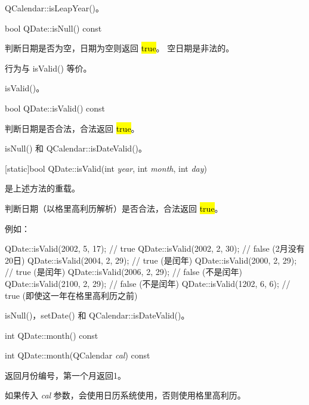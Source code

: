 \begin{seeAlso}
QCalendar::isLeapYear()。
\end{seeAlso}

\splitLine

bool QDate::isNull() const

判断日期是否为空，日期为空则返回 \hl{true}。 空日期是非法的。

\begin{notice}
行为与 isValid() 等价。
\end{notice}

\begin{seeAlso}
isValid()。
\end{seeAlso}

\splitLine

bool QDate::isValid() const

判断日期是否合法，合法返回 \hl{true}。



\begin{seeAlso}
isNull() 和 QCalendar::isDateValid()。
\end{seeAlso}

\splitLine

[static]bool QDate::isValid(int \emph{year}, int \emph{month}, int \emph{day})

是上述方法的重载。

判断日期（以格里高利历解析）是否合法，合法返回 \hl{true}。

例如：

\begin{cppcode}
QDate::isValid(2002, 5, 17);  // true
QDate::isValid(2002, 2, 30);  // false (2月没有20日)
QDate::isValid(2004, 2, 29);  // true (是闰年)
QDate::isValid(2000, 2, 29);  // true (是闰年)
QDate::isValid(2006, 2, 29);  // false (不是闰年)
QDate::isValid(2100, 2, 29);  // false (不是闰年)
QDate::isValid(1202, 6, 6);   // true (即使这一年在格里高利历之前)
\end{cppcode}


\begin{seeAlso}
isNull()，setDate() 和 QCalendar::isDateValid()。
\end{seeAlso}

\splitLine

int QDate::month() const

int QDate::month(QCalendar \emph{cal}) const

返回月份编号，第一个月返回1。

如果传入 \emph{cal} 参数，会使用日历系统使用，否则使用格里高利历。

